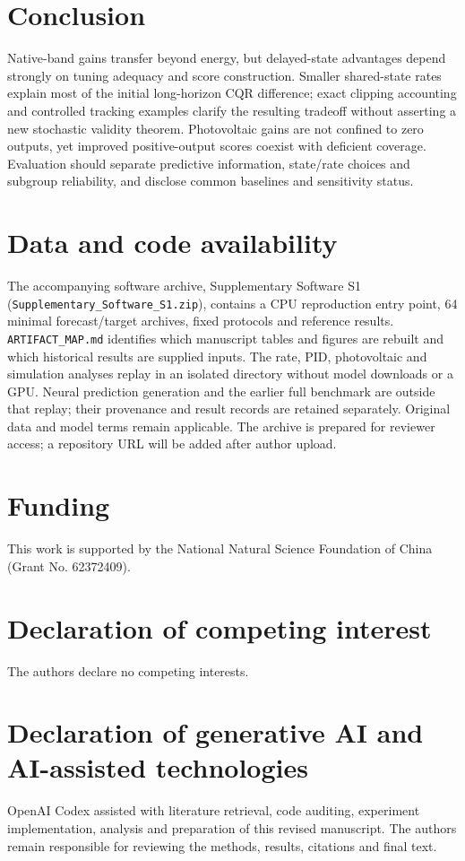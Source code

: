 \documentclass[preprint,11pt]{elsarticle}
\begin{document}
\section{Conclusion}
Native-band gains transfer beyond energy, but delayed-state advantages depend strongly
on tuning adequacy and score construction. Smaller shared-state rates explain most
of the initial long-horizon CQR difference; exact clipping accounting and controlled
tracking examples clarify the resulting tradeoff without asserting a new stochastic
validity theorem. Photovoltaic gains are not confined to zero outputs, yet improved
positive-output scores coexist with deficient coverage. Evaluation should separate
predictive information, state/rate choices and subgroup reliability, and disclose
common baselines and sensitivity status.

\section*{Data and code availability}
The accompanying software archive, Supplementary Software S1
(\texttt{Supplementary\_Software\_S1.zip}), contains a CPU reproduction entry point,
64 minimal forecast/target archives, fixed protocols and reference results.
\texttt{ARTIFACT\_MAP.md} identifies which manuscript tables and figures are rebuilt
and which historical results are supplied inputs. The rate, PID, photovoltaic and
simulation analyses replay in an isolated directory without model downloads or a GPU.
Neural prediction generation and the earlier full benchmark are outside that replay;
their provenance and result records are retained separately. Original data and model
terms remain applicable. The archive is prepared for reviewer access; a repository
URL will be added after author upload.

\section*{Funding}
This work is supported by the National Natural Science Foundation of China
(Grant No. 62372409).

\section*{Declaration of competing interest}
The authors declare no competing interests.

\section*{Declaration of generative AI and AI-assisted technologies}
OpenAI Codex assisted with literature retrieval, code auditing, experiment implementation,
analysis and preparation of this revised manuscript. The authors remain responsible
for reviewing the methods, results, citations and final text.
\end{document}
